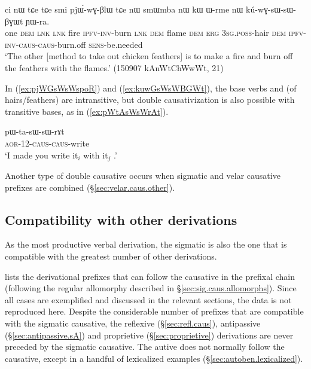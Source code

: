 \begin{exe}
\ex \label{ex:kuwGsWsWBGWt}
\gll ci nɯ tɕe tɕe smi pjɯ́-wɣ-βlɯ tɕe nɯ smɯmba nɯ kɯ ɯ-rme nɯ kú-wɣ-sɯ-sɯ-βɣɯt ɲɯ-ra. \\
one \textsc{dem} \textsc{lnk} \textsc{lnk} fire \textsc{ipfv}-\textsc{inv}-burn \textsc{lnk} \textsc{dem} flame \textsc{dem} \textsc{erg} \textsc{3sg}.\textsc{poss}-hair \textsc{dem} \textsc{ipfv}-\textsc{inv}-\textsc{caus}-\textsc{caus}-burn.off \textsc{sens}-be.needed \\
\glt `The other [method to take out chicken feathers] is to make a fire and burn off the feathers with the flames.' (150907 kAnWtChWwWt, 21)
 \end{exe} 
 
 In (\ref{ex:pjWGsWsWspoR}) and (\ref{ex:kuwGsWsWBGWt}), the base verbs  and  (of hairs/feathers) are intransitive, but double causativization is also possible with transitive bases, as in (\ref{ex:pWtAsWsWrAt}).
 
 \begin{exe}
\ex \label{ex:pWtAsWsWrAt}
\gll  pɯ-ta-sɯ-sɯ-rɤt \\
\textsc{aor}-1\fl{}2-\textsc{caus}-\textsc{caus}-write \\
\glt `I made you write it$_i$ with it$_j$ .' 
  \end{exe} 

Another type of double causative occurs when sigmatic and velar causative prefixes are combined (§\ref{sec:velar.caus.other}).

\subsection{Compatibility with other derivations} \label{sec:sig.caus.other.derivations}
As the most productive verbal derivation, the sigmatic is also the one that is compatible with the greatest number of other derivations.

 lists the derivational prefixes that can follow the causative in the prefixal chain (following the regular allomorphy described in §\ref{sec:sig.caus.allomorphs}). Since all cases are exemplified and discussed in the relevant sections, the data is not reproduced here.  Despite the considerable number of prefixes that are compatible with the sigmatic causative, the reflexive  (§\ref{sec:refl.caus}),  antipassive (§\ref{sec:antipassive.sA}) and proprietive (§\ref{sec:proprietive}) derivations are never preceded by the sigmatic causative. The autive does not normally follow the causative, except in a handful of lexicalized examples (§\ref{sec:autoben.lexicalized}).

